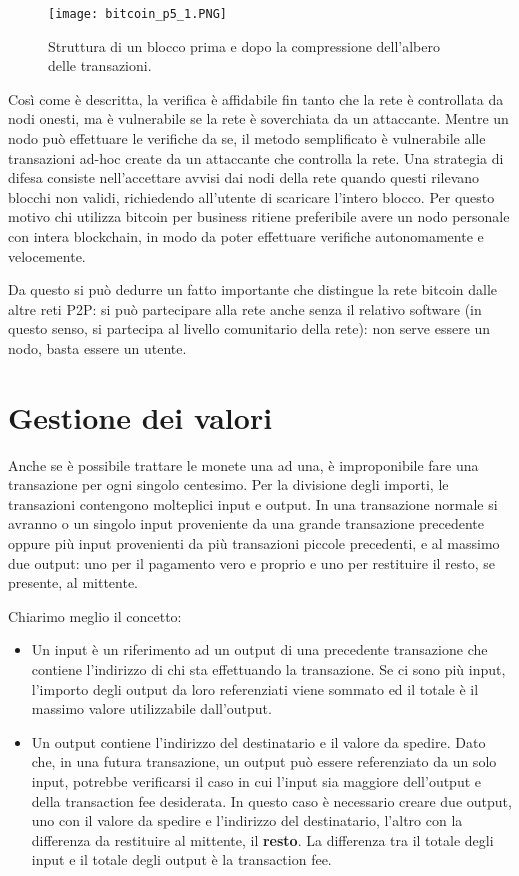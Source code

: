 \begin{figure}[htbp]
\centering
\texttt{[image: bitcoin\_p5\_1.PNG]}
\caption{Struttura di un blocco prima e dopo la compressione dell'albero delle transazioni.\label{bitcoin_p5_1}}
\end{figure}

Così come è descritta, la verifica è affidabile fin tanto che la rete è controllata da nodi onesti, ma è vulnerabile se la rete è soverchiata da un attaccante. Mentre un nodo può effettuare le verifiche da se, il metodo semplificato è vulnerabile alle transazioni ad-hoc create da un attaccante che controlla la rete. Una strategia di difesa consiste nell'accettare avvisi dai nodi della rete quando questi rilevano blocchi non validi, richiedendo all'utente di scaricare l'intero blocco. Per questo motivo chi utilizza bitcoin per business ritiene preferibile avere un nodo personale con intera blockchain, in modo da poter effettuare verifiche autonomamente e velocemente.

Da questo si può dedurre un fatto importante che distingue la rete bitcoin dalle altre reti P2P: si può partecipare alla rete anche senza il relativo software (in questo senso, si partecipa al livello comunitario della rete): non serve essere un nodo, basta essere un utente.

\section{Gestione dei valori}\label{gestione-dei-valori}

Anche se è possibile trattare le monete una ad una, è improponibile fare una transazione per ogni singolo centesimo. Per la divisione degli importi, le transazioni contengono molteplici input e output. In una transazione normale si avranno o un singolo input proveniente da una grande transazione precedente oppure più input provenienti da più transazioni piccole precedenti, e al massimo due output: uno per il pagamento vero e proprio e uno per restituire il resto, se presente, al mittente.

Chiarimo meglio il concetto:

\begin{itemize}
\itemsep1pt\parskip0pt
\item
  Un input è un riferimento ad un output di una precedente transazione   che contiene l'indirizzo di chi sta effettuando la transazione. Se ci   sono più input, l'importo degli output da loro referenziati viene   sommato ed il totale è il massimo valore utilizzabile dall'output.
\item
  Un output contiene l'indirizzo del destinatario e il valore da   spedire. Dato che, in una futura transazione, un output può essere   referenziato da un solo input, potrebbe verificarsi il caso in cui   l'input sia maggiore dell'output e della transaction fee desiderata.   In questo caso è necessario creare due output, uno con il valore da   spedire e l'indirizzo del destinatario, l'altro con la differenza da   restituire al mittente, il \textbf{resto}. La differenza tra il totale   degli input e il totale degli output è la transaction fee.
\end{itemize}

